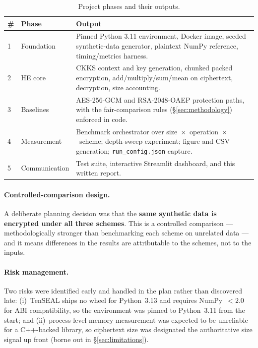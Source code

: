 \documentclass[11pt,a4paper]{article}
\begin{document}
\begin{table}[H]
\centering
\caption{Project phases and their outputs.}
\begin{tabularx}{\linewidth}{@{}p{0.5cm}p{3.3cm}X@{}}
\toprule
\# & \textbf{Phase} & \textbf{Output}\\
\midrule
1 & Foundation & Pinned Python 3.11 environment, Docker image, seeded
    synthetic-data generator, plaintext NumPy reference, timing/metrics harness.\\
2 & HE core & CKKS context and key generation, chunked packed encryption,
    add/multiply/sum/mean on ciphertext, decryption, size accounting.\\
3 & Baselines & AES-256-GCM and RSA-2048-OAEP protection paths, with the
    fair-comparison rules (\S\ref{sec:methodology}) enforced in code.\\
4 & Measurement & Benchmark orchestrator over
    size~$\times$~operation~$\times$~scheme; depth-sweep experiment; figure and
    CSV generation; \texttt{run\_config.json} capture.\\
5 & Communication & Test suite, interactive Streamlit dashboard, and this
    written report.\\
\bottomrule
\end{tabularx}
\end{table}

\paragraph{Controlled-comparison design.} A deliberate planning decision was that
the \textbf{same synthetic data is encrypted under all three schemes}. This is a
controlled comparison --- methodologically stronger than benchmarking each scheme
on unrelated data --- and it means differences in the results are attributable to
the schemes, not to the inputs.

\paragraph{Risk management.} Two risks were identified early and handled in the
plan rather than discovered late: (i)~TenSEAL ships no wheel for Python~3.13 and
requires NumPy~$<2.0$ for ABI compatibility, so the environment was pinned to
Python~3.11 from the start; and (ii)~process-level memory measurement was
expected to be unreliable for a C++-backed library, so ciphertext size was
designated the authoritative size signal up front (borne out in
\S\ref{sec:limitations}).
\end{document}
